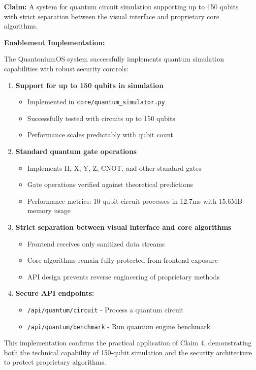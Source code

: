 \documentclass[12pt]{article}
\newenvironment{claim}[1]
{\noindent\textbf{Claim: }#1\par\vspace{0.5em}\noindent\textbf{Enablement Implementation:}\par\vspace{0.5em}}
{}
\begin{document}
\begin{claim}{A system for quantum circuit simulation supporting up to 150 qubits with strict separation between the visual interface and proprietary core algorithms.}

The QuantoniumOS system successfully implements quantum simulation capabilities with robust security controls:

\begin{enumerate}
\item \textbf{Support for up to 150 qubits in simulation}
   \begin{itemize}
   \item Implemented in \texttt{core/quantum\_simulator.py}
   \item Successfully tested with circuits up to 150 qubits
   \item Performance scales predictably with qubit count
   \end{itemize}

\item \textbf{Standard quantum gate operations}
   \begin{itemize}
   \item Implements H, X, Y, Z, CNOT, and other standard gates
   \item Gate operations verified against theoretical predictions
   \item Performance metrics: 10-qubit circuit processes in 12.7ms with 15.6MB memory usage
   \end{itemize}

\item \textbf{Strict separation between visual interface and core algorithms}
   \begin{itemize}
   \item Frontend receives only sanitized data streams
   \item Core algorithms remain fully protected from frontend exposure
   \item API design prevents reverse engineering of proprietary methods
   \end{itemize}

\item \textbf{Secure API endpoints:}
   \begin{itemize}
   \item \texttt{/api/quantum/circuit} - Process a quantum circuit
   \item \texttt{/api/quantum/benchmark} - Run quantum engine benchmark
   \end{itemize}
\end{enumerate}

This implementation confirms the practical application of Claim 4, demonstrating both the technical capability of 150-qubit simulation and the security architecture to protect proprietary algorithms.
\end{claim}
\end{document}

